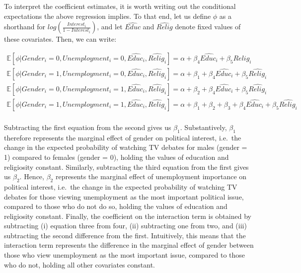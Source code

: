 \documentclass[
]{article}
\begin{document}
To interpret the coefficient estimates, it is worth writing out the
conditional expectations the above regression implies. To that end, let
us define \(\phi\) as a shorthand for
\(log(\frac{Interest_{i}}{1-Interest_{i}})\), and let \(\hat{Educ}\) and
\(\hat{Relig}\) denote fixed values of these covariates. Then, we can
write:

\[
\begin{aligned}
\mathbb{E}[\phi \vert Gender_{i} = 0, Unemployment_{i} = 0, \hat{Educ_{i}}, \hat{Relig_{i}}] = \alpha + \beta_{4}\hat{Educ_{i}} + \beta_{5}\hat{Relig_{i}} \\
\mathbb{E}[\phi \vert Gender_{i} = 1, Unemployment_{i} = 0, \hat{Educ_{i}}, \hat{Relig_{i}}] = \alpha + \beta_{1} + \beta_{4}\hat{Educ_{i}} + \beta_{5}\hat{Relig_{i}} \\
\mathbb{E}[\phi \vert Gender_{i} = 0, Unemployment_{i} = 1, \hat{Educ_{i}}, \hat{Relig_{i}}] = \alpha + \beta_{2} + \beta_{4}\hat{Educ_{i}} + \beta_{5}\hat{Relig_{i}} \\
\mathbb{E}[\phi \vert Gender_{i} = 1, Unemployment_{i} = 1, \hat{Educ_{i}}, \hat{Relig_{i}}] = \alpha + \beta_{1} + \beta_{2} + \beta_{3} + \beta_{4}\hat{Educ_{i}} + \beta_{5}\hat{Relig_{i}} \\
\end{aligned}
\]

Subtracting the first equation from the second gives us \(\beta_{1}\).
Substantively, \(\beta_{1}\) therefore represents the marginal effect of
gender on political interest, i.e.~the change in the expected
probability of watching TV debates for males (gender = 1) compared to
females (gender = 0), holding the values of education and religiosity
constant. Similarly, subtracting the third equation from the first gives
us \(\beta_{2}\). Hence, \(\beta_{2}\) represents the marginal effect of
unemployment importance on political interest, i.e.~the change in the
expected probability of watching TV debates for those viewing
unemployment as the most important political issue, compared to those
who do not do so, holding the values of education and religiosity
constant. Finally, the coefficient on the interaction term is obtained
by subtracting (i) equation three from four, (ii) subtracting one from
two, and (iii) subtracting the second difference from the first.
Intuitively, this means that the interaction term represents the
difference in the marginal effect of gender between those who view
unemployment as the most important issue, compared to those who do not,
holding all other covariates constant.
\end{document}
